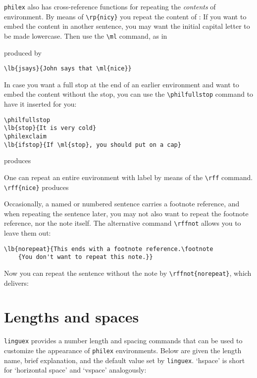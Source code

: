\documentclass[10pt]{article}
\newcommand{\qut}[1]{`#1'}
\newcommand{\emp}{\emph}
\begin{document}
\verb+philex+ also has cross-reference  functions for repeating the \emp{contents} of environment. By means of \verb+\rp{nicy}+ you repeat the content of :  If you want to embed the content in another sentence, you may want the initial capital letter to be made lowercase. Then use the \verb+\ml+ command, as in

	produced by
\begin{verbatim}
\lb{jsays}{John says that \ml{nice}}
\end{verbatim}

In case you want a full stop at the end of an earlier environment and want to embed the content without the stop, you can use the \verb+\philfullstop+ command to have it inserted for you:




\begin{verbatim}
\philfullstop
\lb{stop}{It is very cold}
\philexclaim
\lb{ifstop}{If \ml{stop}, you should put on a cap}
\end{verbatim}
	produces
	
\philfullstop
{}
\philexclaim

\philempty

One can repeat an entire environment with label by means of the \verb+\rff+ command. \verb+\rff{nice}+ produces 

Occasionally, a named or  numbered sentence carries a footnote reference, and when repeating the sentence later, you may not also want to repeat the footnote reference, nor the note itself. The alternative command \verb+\rffnot+ allows you to leave them out:

\begin{verbatim}
\lb{norepeat}{This ends with a footnote reference.\footnote
	{You don't want to repeat this note.}}
\end{verbatim}

% 
% 
Now you can repeat the sentence without the note by 
\verb+\rffnot{norepeat}+, which delivers: 

\section{Lengths and spaces}
\verb+linguex+ provides a number length and spacing commands that can be used to customize the appearance of \verb+philex+ environments. Below are given the length name, brief explanation, and the default value set by \verb+linguex+. \qut{hspace} is short for \qut{horizontal space} and \qut{vspace} analogously:
\end{document}

